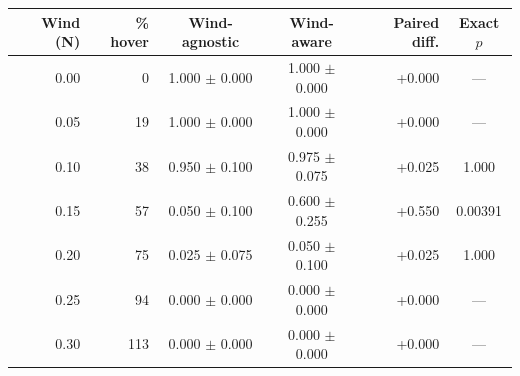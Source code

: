 \begin{tabular}{rrccrc}
\toprule
Wind (N) & \% hover & Wind-agnostic & Wind-aware & Paired diff. & Exact $p$ \\
\midrule
0.00 & 0 & 1.000 $\pm$ 0.000 & 1.000 $\pm$ 0.000 & +0.000 & --- \\
0.05 & 19 & 1.000 $\pm$ 0.000 & 1.000 $\pm$ 0.000 & +0.000 & --- \\
0.10 & 38 & 0.950 $\pm$ 0.100 & 0.975 $\pm$ 0.075 & +0.025 & 1.000 \\
0.15 & 57 & 0.050 $\pm$ 0.100 & 0.600 $\pm$ 0.255 & +0.550 & 0.00391 \\
0.20 & 75 & 0.025 $\pm$ 0.075 & 0.050 $\pm$ 0.100 & +0.025 & 1.000 \\
0.25 & 94 & 0.000 $\pm$ 0.000 & 0.000 $\pm$ 0.000 & +0.000 & --- \\
0.30 & 113 & 0.000 $\pm$ 0.000 & 0.000 $\pm$ 0.000 & +0.000 & --- \\
\bottomrule
\end{tabular}
